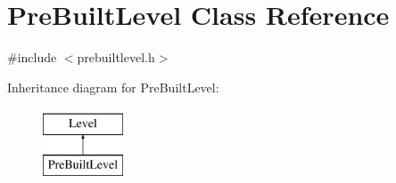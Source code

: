 \hypertarget{class_pre_built_level}{}\section{Pre\+Built\+Level Class Reference}
\label{class_pre_built_level}


{\ttfamily \#include $<$prebuiltlevel.\+h$>$}

Inheritance diagram for Pre\+Built\+Level\+:\begin{figure}[H]
\begin{center}
\leavevmode
\includegraphics[height=2.000000cm]{class_pre_built_level}
\end{center}
\end{figure}
